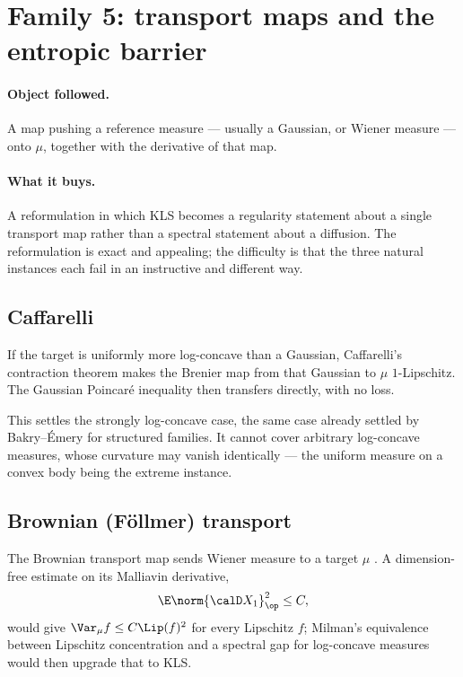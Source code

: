 \documentclass[../../main.tex]{subfiles}
\begin{document}
\section{Family 5: transport maps and the entropic barrier}
\label{sec:family-transport}

\paragraph{Object followed.}
A map pushing a reference measure --- usually a Gaussian, or Wiener measure --- onto $\mu$,
together with the derivative of that map.

\paragraph{What it buys.}
A reformulation in which KLS becomes a regularity statement about a single transport map rather
than a spectral statement about a diffusion. The reformulation is exact and appealing; the
difficulty is that the three natural instances each fail in an instructive and different way.

\subsection{Caffarelli}
\label{subsec:transport-caffarelli}

If the target is uniformly more log-concave than a Gaussian, Caffarelli's contraction theorem makes
the Brenier map from that Gaussian to $\mu$ $1$-Lipschitz. The Gaussian Poincar\'e inequality then
transfers directly, with no loss.

This settles the strongly log-concave case, the same case already settled by Bakry--\'Emery for
structured families. It cannot cover arbitrary log-concave measures, whose curvature may
vanish identically --- the uniform measure on a convex body being the extreme instance.

\subsection{Brownian (F\"ollmer) transport}
\label{subsec:transport-brownian}

The Brownian transport map sends Wiener measure to a target $\mu$ \cite{MikulincerShenfeld2021BrownianTransport}.
A dimension-free estimate on its Malliavin derivative,
\begin{equation}
  \E\norm{\calD X_1}_\op^2\le C,
  \label{eq:brownian-derivative}
\end{equation}
would give $\Var_\mu f\le C\Lip(f)^2$ for every Lipschitz $f$; Milman's equivalence between
Lipschitz concentration and a spectral gap for log-concave measures
\cite{Milman2009Isoperimetric} would then upgrade that to KLS.
\end{document}
